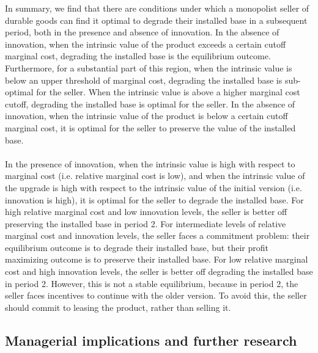 \documentclass{article}
\begin{document}
In summary, we find that there are conditions under which a monopolist seller of durable goods can find it optimal to degrade their installed base
in a subsequent period, both in the presence and absence of innovation. In the absence of innovation, when the intrinsic value of the product exceeds
a certain cutoff marginal cost, degrading the installed base is the equilibrium outcome. Furthermore, for a substantial part of this region, when
the intrinsic value is below an upper threshold of marginal cost, degrading the installed base is sub-optimal for the seller. When the intrinsic
value is above a higher marginal cost cutoff, degrading the installed base is optimal for the seller. In the absence of innovation, when the intrinsic
value of the product is below a certain cutoff marginal cost, it is optimal for the seller to preserve the value of the installed base.\\
\\
In the presence of innovation, when the intrinsic value is high with respect to marginal cost (i.e. relative marginal cost is low), and when the
intrinsic value of the upgrade is high with respect to the intrinsic value of the initial version (i.e. innovation is high), it is optimal for the
seller to degrade the installed base. For high relative marginal cost and low innovation levels, the seller is better off preserving the installed
base in period 2. For intermediate levels of relative marginal cost and innovation levels, the seller faces a commitment problem: their equilibrium
outcome is to degrade their installed base, but their profit maximizing outcome is to preserve their installed base. For low relative marginal cost
and high innovation levels, the seller is better off degrading the installed base in period 2. However, this is not a stable equilibrium, because
in period 2, the seller faces incentives to continue with the older version. To avoid this, the seller should commit to leasing the product, rather
than selling it.

\subsection*{Managerial implications and further research}
\end{document}
